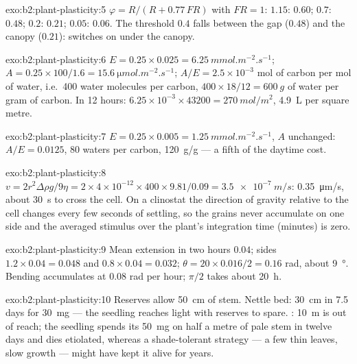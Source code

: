 \begin{solution}{exo:b2:plant-plasticity:5}
$\varphi = R/(R + 0.77\,FR)$ with $FR = 1$: $1.15$: $0.60$; $0.7$:
$0.48$; $0.2$: $0.21$; $0.05$: $0.06$. The threshold $0.4$ falls
between the gap ($0.48$) and the canopy ($0.21$): 
switches on under the canopy.
\end{solution}

\begin{solution}{exo:b2:plant-plasticity:6}
$E = 0.25\times 0.025 = \qty{6.25}{mmol.m^{-2}.s^{-1}}$; $A =
0.25\times 100/1.6 = \qty{15.6}{\micro mol.m^{-2}.s^{-1}}$; $A/E =
2.5\times 10^{-3}$ mol of carbon per mol of water, i.e.\ 400 water
molecules per carbon, $400\times 18/12 = \qty{600}{g}$ of water per
gram of carbon. In 12 hours: $6.25\times 10^{-3}\times 43200 =
\qty{270}{mol/m^2}$, \qty{4.9}{L} per square metre.
\end{solution}

\begin{solution}{exo:b2:plant-plasticity:7}
$E = 0.25\times 0.005 = \qty{1.25}{mmol.m^{-2}.s^{-1}}$, $A$
unchanged: $A/E = 0.0125$, 80 waters per carbon, \qty{120}{g/g} ---
a fifth of the daytime cost.
\end{solution}

\begin{solution}{exo:b2:plant-plasticity:8}
$v = 2r^{2}\Delta\rho g/9\eta = 2\times 4\times 10^{-12}\times
400\times 9.81/0.09 = \qty{3.5e-7}{m/s}$: \qty{0.35}{\micro m/s},
about \qty{30}{s} to cross the cell. On a clinostat the direction of
gravity relative to the cell changes every few seconds of settling,
so the grains never accumulate on one side and the averaged
stimulus over the plant's integration time (minutes) is zero.
\end{solution}

\begin{solution}{exo:b2:plant-plasticity:9}
Mean extension in two hours $0.04$; sides $1.2\times 0.04 = 0.048$
and $0.8\times 0.04 = 0.032$; $\theta = 20\times 0.016/2 = 0.16$
rad, about \qty{9}{\degree}. Bending accumulates at $0.08$ rad per
hour; $\pi/2$ takes about \qty{20}{h}.
\end{solution}

\begin{solution}{exo:b2:plant-plasticity:10}
Reserves allow \qty{50}{cm} of stem. Nettle bed: \qty{30}{cm} in
7.5 days for \qty{30}{mg} --- the seedling reaches light with
reserves to spare. : \qty{10}{m} is out of reach; the seedling
spends its \qty{50}{mg} on half a metre of pale stem in twelve
days and dies etiolated, whereas a shade-tolerant strategy --- a
few thin leaves, slow growth --- might have kept it alive for years.
\end{solution}

